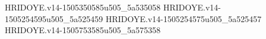 HRIDOYE.v14-1505350585u505_5a535058
HRIDOYE.v14-1505254595u505_5a525459
HRIDOYE.v14-1505254575u505_5a525457
HRIDOYE.v14-1505753585u505_5a575358
